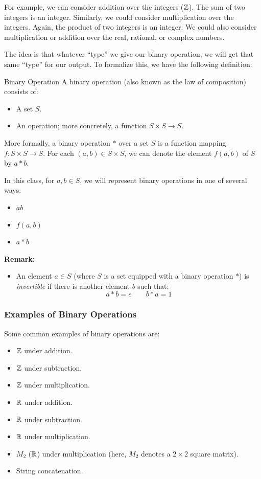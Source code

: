 \documentclass[letterpaper]{article}
\begin{document}
\bigskip 

For example, we can consider addition over the integers ($\mathbb{Z}$). The sum of two integers is an integer. Similarly, we could consider multiplication over the integers. Again, the product of two integers is an integer. We could also consider multiplication or addition over the real, rational, or complex numbers. 

\bigskip 

The idea is that whatever ``type'' we give our binary operation, we will get that same ``type'' for our output. To formalize this, we have the following definition:  
\begin{definition}{Binary Operation}{}
    A binary operation (also known as the law of composition) consists of: 
    \begin{itemize}
        \item A set $S$. 
        \item An operation; more concretely, a function $S \times S \to S$.
    \end{itemize}

    More formally, a binary operation $*$ over a set $S$ is a function mapping $f: S \times S \to S$. For each $(a, b) \in S \times S$, we can denote the element $f(a, b)$ of $S$ by $a * b$.

    \bigskip 

    In this class, for $a, b \in S$, we will represent binary operations in one of several ways: 
    \begin{itemize}
        \item $ab$
        \item $f(a, b)$
        \item $a * b$
    \end{itemize}
\end{definition}

\textbf{Remark:}
\begin{itemize}
    \item An element $a \in S$ (where $S$ is a set equipped with a binary operation $*$) is \emph{invertible} if there is another element $b$ such that: 
    \[a * b = e \qquad b * a = 1\]
\end{itemize}


\subsubsection{Examples of Binary Operations}
Some common examples of binary operations are: 
\begin{itemize}
    \item $\mathbb{Z}$ under addition. 
    \item $\mathbb{Z}$ under subtraction. 
    \item $\mathbb{Z}$ under multiplication. 
    \item $\mathbb{R}$ under addition. 
    \item $\mathbb{R}$ under subtraction. 
    \item $\mathbb{R}$ under multiplication.
    \item $M_{2}$ ($\mathbb{R}$) under multiplication (here, $M_{2}$ denotes a $2 \times 2$ square matrix). 
    \item String concatenation.
\end{itemize}
\end{document}
